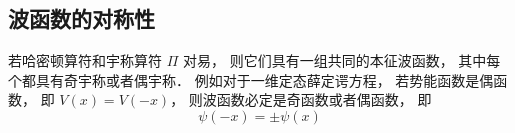 
\subsection{波函数的对称性}
若哈密顿算符和宇称算符 $\Pi$ 对易， 则它们具有一组共同的本征波函数， 其中每个都具有奇宇称或者偶宇称． 例如对于一维定态薛定谔方程， 若势能函数是偶函数， 即 $V(x) = V(-x)$， 则波函数必定是奇函数或者偶函数， 即
\begin{equation}\label{SchEq_eq3}
\psi(-x) = \pm \psi(x)
\end{equation}
